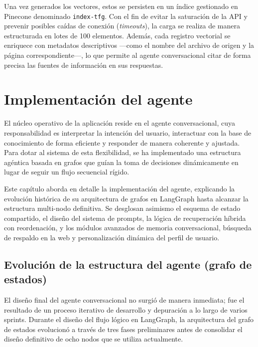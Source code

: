 \documentclass[12pt,a4paper,oneside]{report}
\begin{document}
Una vez generados los vectores, estos se persisten en un índice gestionado en Pinecone denominado \texttt{index-tfg}. Con el fin de evitar la saturación de la API y prevenir posibles caídas de conexión (\textit{timeouts}), la carga se realiza de manera estructurada en lotes de 100 elementos. Además, cada registro vectorial se enriquece con metadatos descriptivos —como el nombre del archivo de origen y la página correspondiente—, lo que permite al agente conversacional citar de forma precisa las fuentes de información en sus respuestas.

\chapter{Implementación del agente}

El núcleo operativo de la aplicación reside en el agente conversacional, cuya responsabilidad es interpretar la intención del usuario, interactuar con la base de conocimiento de forma eficiente y responder de manera coherente y ajustada. Para dotar al sistema de esta flexibilidad, se ha implementado una estructura agéntica basada en grafos que guían la toma de decisiones dinámicamente en lugar de seguir un flujo secuencial rígido.

Este capítulo aborda en detalle la implementación del agente, explicando la evolución histórica de su arquitectura de grafos en LangGraph hasta alcanzar la estructura multi-nodo definitiva. Se desglosan asimismo el esquema de estado compartido, el diseño del sistema de prompts, la lógica de recuperación híbrida con reordenación, y los módulos avanzados de memoria conversacional, búsqueda de respaldo en la web y personalización dinámica del perfil de usuario.

\section{Evolución de la estructura del agente (grafo de estados)}

El diseño final del agente conversacional no surgió de manera inmediata; fue el resultado de un proceso iterativo de desarrollo y depuración a lo largo de varios sprints. Durante el diseño del flujo lógico en LangGraph, la arquitectura del grafo de estados evolucionó a través de tres fases preliminares antes de consolidar el diseño definitivo de ocho nodos que se utiliza actualmente.
\end{document}
